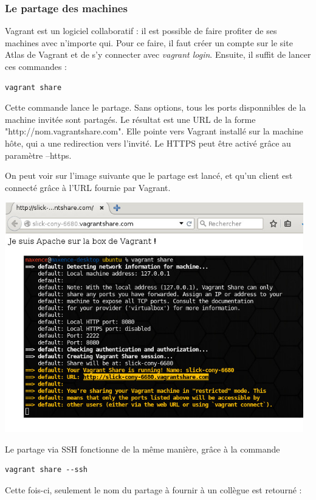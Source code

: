 \documentclass[12pt,a4paper]{article}
\begin{document}
\subsubsection{Le partage des machines}
Vagrant est un logiciel collaboratif : il est possible de faire profiter de ses machines avec n'importe qui. Pour ce faire, il faut créer un compte sur le site Atlas de Vagrant et de s'y connecter avec \textit{vagrant login}. Ensuite, il suffit de lancer ces commandes :
\begin{lstlisting}
vagrant share
\end{lstlisting}

Cette commande lance le partage. Sans options, tous les ports disponnibles de la machine invitée sont partagés. Le résultat est une URL de la forme "http://nom.vagrantshare.com". Elle pointe vers Vagrant installé sur la machine hôte, qui a une redirection vers l'invité. Le HTTPS peut être activé grâce au paramètre --https.

On peut voir sur l'image suivante que le partage est lancé, et qu'un client est connecté grâce à l'URL fournie par Vagrant.

\begin{center}
	\includegraphics[width=13cm]{images_rapport/sharehttp.jpg}
\end{center}

Le partage via SSH fonctionne de la même manière, grâce à la commande
\begin{lstlisting}
vagrant share --ssh
\end{lstlisting}
Cette fois-ci, seulement le nom du partage à fournir à un collègue est retourné :
\end{document}
